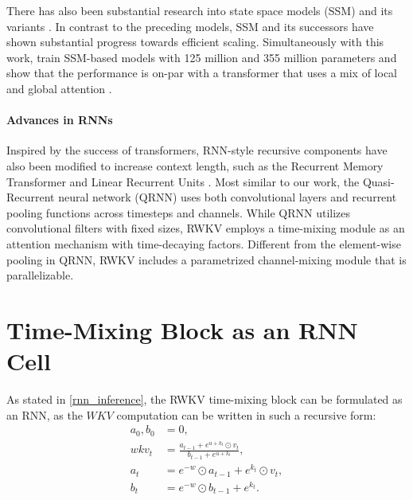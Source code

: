 \documentclass[11pt]{article}
\begin{document}
There has also been substantial research into state space models (SSM) \citep{gu2021efficiently} and its variants \citep{dao2022hungry,gupta2022diagonal,poli2023hyena}. In contrast to the preceding models, SSM and its successors have shown substantial progress towards efficient scaling. Simultaneously with this work, \citet{poli2023hyena} train SSM-based models with 125 million and 355 million parameters and show that the performance is on-par with a transformer that uses a mix of local and global attention \citep{black2021gpt}.

\paragraph{Advances in RNNs}

Inspired by the success of transformers, RNN-style \cite{RNN_LSTM97, RNN_GRU2014} recursive components have also been modified to increase context length, such as the Recurrent Memory Transformer \cite{bulatov2022recurrent,bulatov2023scaling} and Linear Recurrent Units \cite{orvieto2023resurrecting}.
Most similar to our work, the Quasi-Recurrent neural network (QRNN)  \cite{RNN_QuasiRNN17} uses both convolutional layers and recurrent pooling functions across timesteps and channels. While QRNN utilizes convolutional filters with fixed sizes, RWKV employs a time-mixing module as an attention mechanism with time-decaying factors. Different from the element-wise pooling in QRNN, RWKV includes a parametrized channel-mixing module  that is parallelizable.


\section{Time-Mixing Block as an RNN Cell}
\label{sec:appendix-rnn}
As stated in \ref{rnn_inference}, the RWKV time-mixing block can be formulated as an RNN, as the $WKV$ computation can be written in such a recursive form:
\begin{align}
    a_0, b_0 &= 0, \\
    \label{eq:wkv-recur}
    wkv_t &= \frac{a_{t-1} + e^{u + k_t} \odot v_t}{b_{t-1} + e^{u + k_t}}, \\
    a_t &= e^{-w} \odot a_{t-1} + e^{k_t} \odot v_t, \label{eq:statea}\\
    b_t &= e^{-w} \odot b_{t-1} + e^{k_t}. \label{eq:stateb}
\end{align}
\end{document}
